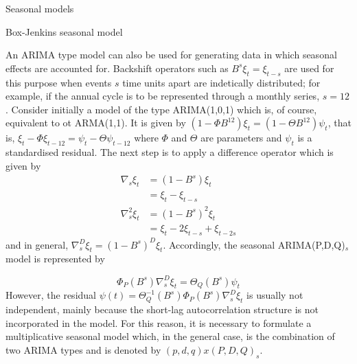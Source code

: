 \documentclass[8pt]{beamer}
\renewcommand{\emph}[1]{\textcolor{myorange}{#1}}
\begin{document}
\begin{frame}{Seasonal models}
    \begin{block}{Box-Jenkins seasonal model}
    \end{block}
    An \emph{ARIMA} type model can also be used for generating data in which seasonal effects are accounted for. \emph{Backshift} operators such as $B^s \xi_t = \xi_{t-s}$ are used for this purpose when events $s$ time units apart are \emph{indetically distributed}; for example, if the \emph{annual cycle} is to be represented through a monthly series, $s=12$. Consider initially a model of the type \emph{ARIMA(1,0,1)} which is, of course, equivalent to ot \emph{ARMA(1,1)}. It is given by $(1-\Phi B^{12})\xi_t = (1-\Theta B^{12})\psi_t$, that is, $\xi_t - \Phi \xi_{t-12} = \psi_t - \Theta \psi_{t-12}$ where $\Phi$ and $\Theta$ are parameters and $\psi_t$ is a standardised residual. The next step is to apply a difference operator which is given by
    \begin{align*}
        \nabla_s \xi_t &= (1-B^s) \xi_t \\
                       &= \xi_t - \xi_{t-s} \\
        \nabla_s^2 \xi_t &= (1-B^s)^2 \xi_t \\
                         &= \xi_t - 2\xi_{t-s} + \xi_{t-2s}
    \end{align*}
     and in general, $\nabla_s^D \xi_t = (1-B^s)^D \xi_t$. Accordingly, the seasonal \emph{ARIMA(P,D,Q)$_s$} model is represented by

\begin{equation}
    \Phi_P (B^s) \nabla_s^D \xi_t = \Theta_Q (B^s)\psi_t
        \label{e456}
    \end{equation}
    However, the \emph{residual} $\psi(t) = \Theta_Q^{-1} (B^s) \Phi_P (B^s) \nabla_s^D \xi_t$ is usually not independent, mainly because the \emph{short-lag autocorrelation structure} is not incorporated in the model. For this reason, it is necessary to formulate a multiplicative  seasonal model which, in the general case, is the combination of two \emph{ARIMA} types and is denoted by $(p,d,q)x(P,D,Q)_s$.  
\end{frame}
\end{document}

